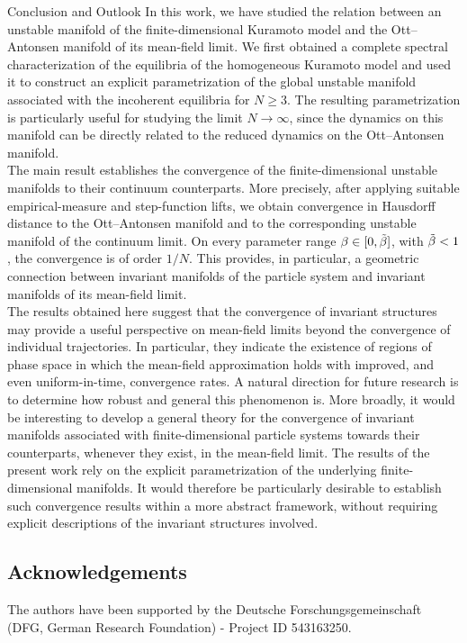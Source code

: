 \documentclass{article}
\theoremstyle{definition}
\begin{document}
\begin{section}{Conclusion and Outlook}\label{concl}
In this work, we have studied the relation between an unstable manifold of the finite-dimensional Kuramoto model and the Ott–Antonsen manifold of its mean-field limit. We first obtained a complete spectral characterization of the equilibria of the homogeneous Kuramoto model and used it to construct an explicit parametrization of the global unstable manifold associated with the incoherent equilibria for $N\geq3$. The resulting parametrization is particularly useful for studying the limit $N\to\infty$, since the dynamics on this manifold can be directly related to the reduced dynamics on the Ott–Antonsen manifold.\\

The main result establishes the convergence of the finite-dimensional unstable manifolds to their continuum counterparts. More precisely, after applying suitable empirical-measure and step-function lifts, we obtain convergence in Hausdorff distance to the Ott–Antonsen manifold and to the corresponding unstable manifold of the continuum limit. On every parameter range $\beta\in[0,\Tilde{\beta}]$, with $\Tilde{\beta}<1$, the convergence is of order $1/N$. This provides, in particular, a geometric connection between invariant manifolds of the particle system and invariant manifolds of its mean-field limit.\\

The results obtained here suggest that the convergence of invariant structures may provide a useful perspective on mean-field limits beyond the convergence of individual trajectories. In particular, they indicate the existence of regions of phase space in which the mean-field approximation holds with improved, and even uniform-in-time, convergence rates. A natural direction for future research is to determine how robust and general this phenomenon is. More broadly, it would be interesting to develop a general theory for the convergence of invariant manifolds associated with finite-dimensional particle systems towards their counterparts, whenever they exist, in the mean-field limit. The results of the present work rely on the explicit parametrization of the underlying finite-dimensional manifolds. It would therefore be particularly desirable to establish such convergence results within a more abstract framework, without requiring explicit descriptions of the invariant structures involved.
\subsection*{Acknowledgements}
 The authors have been supported by the  Deutsche Forschungsgemeinschaft (DFG, German Research Foundation) - Project ID 543163250.
\end{section}
%


\appendix\label{APP}
\end{document}
